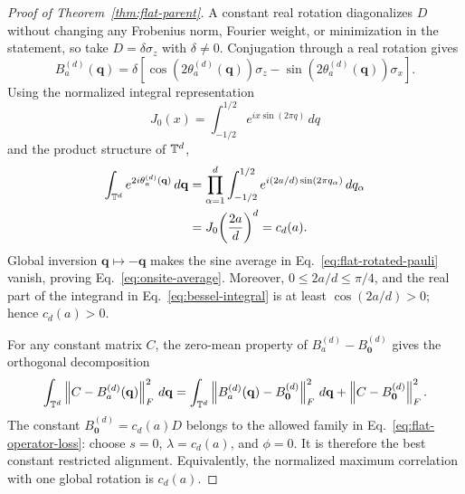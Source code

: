 \begin{proof}[Proof of Theorem~\ref{thm:flat-parent}]
A constant real rotation diagonalizes $D$ without changing any Frobenius norm, Fourier
weight, or minimization in the statement, so take $D=\delta\sigma_z$ with
$\delta\ne0$. Conjugation through a real rotation gives
\begin{equation}
 B_a^{(d)}(\mathbf q)
 =\delta\left[
 \cos\!\left(2\theta_a^{(d)}(\mathbf q)\right)\sigma_z
 -\sin\!\left(2\theta_a^{(d)}(\mathbf q)\right)\sigma_x
 \right].
 \label{eq:flat-rotated-pauli}
\end{equation}
Using the normalized integral representation
\begin{equation}
 J_0(x)=\int_{-1/2}^{1/2}e^{ix\sin(2\pi q)}\,dq
 \label{eq:bessel-integral}
\end{equation}
and the product structure of $\mathbb T^d$,
\begin{align}
 \int_{\mathbb T^d}e^{2i\theta_a^{(d)}(\mathbf q)}\,d\mathbf q
 &=\prod_{\alpha=1}^d
   \int_{-1/2}^{1/2}
   e^{i(2a/d)\sin(2\pi q_\alpha)}\,dq_\alpha\\
 &=J_0\!\left(\frac{2a}{d}\right)^d=c_d(a).
\end{align}
Global inversion $\mathbf q\mapsto-\mathbf q$ makes the sine average in
Eq.~\eqref{eq:flat-rotated-pauli} vanish, proving
Eq.~\eqref{eq:onsite-average}. Moreover,
$0\le2a/d\le\pi/4$, and the real part of the integrand in
Eq.~\eqref{eq:bessel-integral} is at least $\cos(2a/d)>0$; hence $c_d(a)>0$.

For any constant matrix $C$, the zero-mean property of
$B_a^{(d)}-B_{\mathbf0}^{(d)}$ gives the orthogonal decomposition
\begin{equation}
 \int_{\mathbb T^d}\left\lVert C-B_a^{(d)}(\mathbf q)\right\rVert_F^2\,d\mathbf q
 =\int_{\mathbb T^d}\left\lVert B_a^{(d)}(\mathbf q)-B_{\mathbf0}^{(d)}\right\rVert_F^2\,d\mathbf q
  +\left\lVert C-B_{\mathbf0}^{(d)}\right\rVert_F^2.
 \label{eq:constant-projection}
\end{equation}
The constant $B_{\mathbf0}^{(d)}=c_d(a)D$ belongs to the allowed family in
Eq.~\eqref{eq:flat-operator-loss}: choose $s=0$, $\lambda=c_d(a)$, and $\phi=0$.
It is therefore the best constant restricted alignment. Equivalently, the normalized
maximum correlation with one global rotation is $c_d(a)$.


\end{proof}
